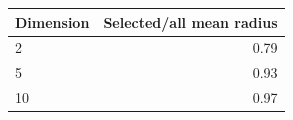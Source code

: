 \begin{tabular}{lr}
\toprule
Dimension & Selected/all mean radius \\
\midrule
2 & 0.79 \\
5 & 0.93 \\
10 & 0.97 \\
\bottomrule
\end{tabular}
